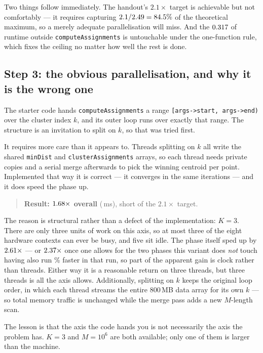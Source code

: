 \documentclass[11pt,a4paper]{article}
\newcommand{\ms}[1]{#1\,ms}
\begin{document}
Two things follow immediately. The handout's $2.1\times$ target is achievable
but not comfortably --- it requires capturing
$2.1 / 2.49 = 84.5\%$ of the theoretical maximum, so a
merely adequate parallelisation will miss. And the $0.317$ of
runtime outside \texttt{computeAssignments} is untouchable under the
one-function rule, which fixes the ceiling no matter how well the rest is done.

\subsection{Step 3: the obvious parallelisation, and why it is the wrong one}

The starter code hands \texttt{computeAssignments} a range
\texttt{[args->start, args->end)} over the cluster index $k$, and its outer
loop runs over exactly that range. The structure is an invitation to split on
$k$, so that was tried first.

It requires more care than it appears to. Threads splitting on $k$ all write
the shared \texttt{minDist} and \texttt{clusterAssignments} arrays, so each
thread needs private copies and a serial merge afterwards to pick the winning
centroid per point. Implemented that way it is correct --- it converges in the
same \prognSixIters{} iterations --- and it does speed the phase up.

\begin{quote}
\textbf{Result: $1.68\times$ overall} (\ms{\prognSixByKMs}),
short of the $2.1\times$ target.
\end{quote}

The reason is structural rather than a defect of the implementation:
$K = 3$. There are only three units of work on this axis, so at most three of
the eight hardware contexts can ever be busy, and five sit idle. The phase
itself sped up by $2.61\times$ --- or
$2.37\times$ once one allows for the two phases this
variant does \emph{not} touch having also run \prognSixByKDrift\% faster in
that run, so part of the apparent gain is clock rather than threads. Either way
it is a reasonable return on three threads, but three threads is all the axis
allows. Additionally, splitting on $k$ keeps
the original loop order, in which each thread streams the entire 800\,MB data
array for its own $k$ --- so total memory traffic is unchanged while the merge
pass adds a new $M$-length scan.

The lesson is that the axis the code hands you is not necessarily the axis the
problem has. $K = 3$ and $M = 10^{6}$ are both available; only one of them is
larger than the machine.
\end{document}
